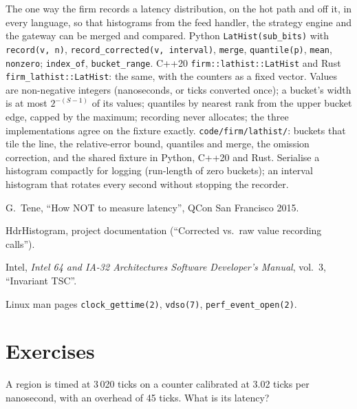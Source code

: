 \begin{build}
 The one way the firm records a latency distribution, on the hot path and off it, in every language, so
that histograms from the feed handler, the strategy engine and the gateway can be merged and compared.
 Python \texttt{LatHist(sub\_bits)} with \texttt{record(v, n)}, \texttt{record\_corrected(v,
interval)}, \texttt{merge}, \texttt{quantile(p)}, \texttt{mean}, \texttt{nonzero}; \texttt{index\_of}, \texttt{bucket\_range}.
C++20 \texttt{firm::lathist::LatHist} and Rust \texttt{firm\_lathist::LatHist}: the same, with the counters as a fixed
vector.
 Values are non-negative integers (nanoseconds, or ticks converted once); a bucket's width is at most
$2^{-(S-1)}$ of its values; quantiles by nearest rank from the upper bucket edge, capped by the maximum; recording never
allocates; the three implementations agree on the fixture exactly.
 \texttt{code/firm/lathist/}: buckets that tile the line, the relative-error bound, quantiles and
merge, the omission correction, and the shared fixture in Python, C++20 and Rust.
 Serialise a histogram compactly for logging (run-length of zero buckets); an interval histogram that
rotates every second without stopping the recorder.
\end{build}

\begin{omsources}
\item G.~Tene, ``How NOT to measure latency'', QCon San Francisco 2015.
\item HdrHistogram, project documentation (``Corrected vs.\ raw value recording calls'').
\item Intel, \emph{Intel 64 and IA-32 Architectures Software Developer's Manual}, vol.~3, ``Invariant TSC''.
\item Linux man pages \texttt{clock\_gettime(2)}, \texttt{vdso(7)}, \texttt{perf\_event\_open(2)}.
\end{omsources}

\section{Exercises}

\begin{exercise}[$\star$]\label{exo:ll:measuring-latency:1}
A region is timed at 3\,020 ticks on a counter calibrated at 3.02 ticks per nanosecond, with an overhead of 45 ticks. What
is its latency?
\end{exercise}

